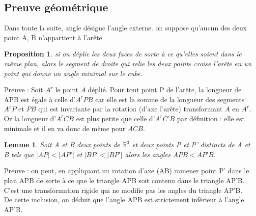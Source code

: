 \documentclass{article}
\newtheorem{prop}{Proposition}
\newtheorem{lem}{Lemme}
\begin{document}


\subsection{Preuve géométrique}

Dans toute la suite, angle désigne l’angle externe. on suppose qu'aucun des deux point A, B n'appartient à l'arête

\begin{prop}
si on déplie les deux faces de sorte à ce qu’elles soient dans le même plan, alors le segment de droite qui relie les deux points croise l’arête en un point qui donne un angle minimal sur le cube.
\end{prop}
Preuve : 
Soit $A^r$ le point $A$ déplié. Pour tout point P de l’arête, la longueur de APB est égale à celle d’$A^rPB$ car elle est la somme de la longueur des segments $A^rP$ et $PB$ qui est invariante par la rotation (d’axe l’arête) transformant $A$ en $A^r$. Or la longueur d’$A^rCB$ est plus petite que celle d’$A^rC’B$ par définition : elle est minimale et il en va donc de même pour $ACB.$


\begin{lem}
Soit A et B deux points de $\mathbb{R}^3$ et deux points P et P’ distincts de A et B tels que $|AP|<|AP’|$ et $|BP|<|BP’|$ alors les angles $APB<AP’B$.
\end{lem}
Preuve : on peut, en appliquant un rotation d’axe (AB) ramener point P’ dans le plan APB de sorte à ce que le triangle APB soit contenu dans le triangle AP’B. C’est une transformation rigide qui ne modifie pas les angles du triangle AP’B. De cette inclusion, on déduit que l’angle APB est strictement inférieur à l’angle AP’B.  
\end{document}
